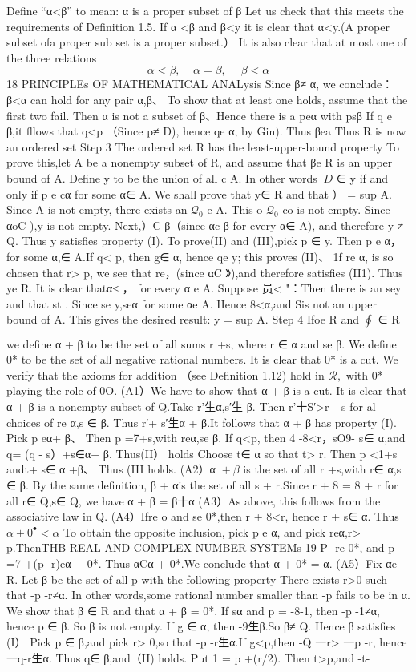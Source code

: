 Define “α<β” to mean: α is a proper subset of β Let us check that this meets the requirements of Definition 1.5. If α <β and β<y it is clear that α<y.(A proper subset ofa proper sub set is a proper subset.） It is also clear that at most one of the three relations $$ \alpha<\beta,\ \ \ \ \ \alpha=\beta,\ \ \,\ \ \ \beta<\alpha $$18 PRINCIPLEs OF MATHEMATICAL ANALysis Since β≠ α, we conclude： β<α can hold for any pair α,β、 To show that at least one holds, assume that the first two fail. Then α is not a subset of β、Hence there is a peα with psβ If q e β,it fllows that q<p （Since p≠ D), hence qe α, by Gin). Thus βea Thus R is now an ordered set Step 3 The ordered set R has the least-upper-bound property To prove this,let A be a nonempty subset of R, and assume that βe R is an upper bound of A. Define y to be the union of all c A. In other words $\ D$ ∈ y if and only if p e cα for some α∈ A. We shall prove that y∈ R and that ） = sup A. Since A is not empty, there exists an ${\mathcal{Q}}_{0}$ e A. This o ${\mathcal{Q}}_{0}$ co is not empty. Since αoC ),y is not empty. Next,）C β（since αc β for every α∈ A), and therefore y ≠ Q. Thus y satisfies property (I). To prove(II) and (III),pick p ∈ y. Then p e α， for some α,∈ A.If q< p, then g∈ α, hence qe y; this proves (II)、 1f re α, is so chosen that r> p, we see that re，(since αC 》),and therefore satisfies (II1). Thus ye R. It is clear thatα≤ ， for every α e A. Suppose 员< "：Then there is an sey and that st . Since se y,seα for some αe A. Hence 8<α,and Sis not an upper bound of A. This gives the desired result: y = sup A. Step 4 Ifoe R and $\underline{{{\oint}}}$ ∈ R we define α + β to be the set of all sums r +s, where r ∈ α and se β. We define 0* to be the set of all negative rational numbers. It is clear that 0* is a cut. We verify that the axioms for addition （see Definition 1.12) hold in ${\mathcal{R}},$ with 0* playing the role of 0O. (A1）We have to show that α + β is a cut. It is clear that α + β is a nonempty subset of Q.Take r’生α,s′生 β. Then r’十S′>r +s for al choices of re α,s ∈ β. Thus r′+ s′生α + β.It follows that α + β has property (I). Pick p eα+ β、 Then p =7+s,with reα,se β. If q<p, then 4 -8<r，sO9- s∈ α,and q= (q - s）+s∈α+ β. Thus(II） holds Choose t∈ α so that t> r. Then p <1+s andt+ s∈ α +β、 Thus (III holds. (A2）α ${}+\beta$ is the set of all r +s,with r∈ α,s ∈ β. By the same definition, β + αis the set of all s + r.Since r + 8 = 8 + r for all r∈ Q,s∈ Q, we have α + β = β十α (A3）As above, this follows from the associative law in Q. (A4）Ifre o and se 0*,then r + 8<r, hence r + s∈ α. Thus $\alpha+0^{\bullet}<\alpha$ To obtain the opposite inclusion, pick p e α, and pick reα,r> p.ThenTHB REAL AND COMPLEX NUMBER SYSTEMs 19 P -re 0*, and p =7 +(p -r)eα + 0*. Thus αCα + 0*.We conclude that α + 0* = α. (A5）Fix αe R. Let β be the set of all p with the following property There exists r>0 such that -p -r≠α. In other words,some rational number smaller than -p fails to be in α. We show that β ∈ R and that α + β = 0*. If sα and p = -8-1, then -p -1≠α, hence p ∈ β. So β is not empty. If g ∈ α, then -9生β.So β≠ Q. Hence β satisfies (I） Pick p ∈ β,and pick r> 0,so that -p -r生α.If g<p,then -Q 一r> 一p -r, hence 一q-r生α. Thus q∈ β,and（II) holds. Put 1 = p +(r/2). Then t>p,and -t- 